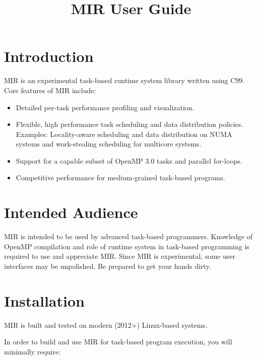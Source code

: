 \documentclass[11pt,a4paper]{article}
\title{MIR User Guide}
\begin{document}
\maketitle

\section{Introduction}\label{introduction}

MIR is an experimental task-based runtime system library written using C99.
Core features of MIR include:

\begin{itemize}
    \item Detailed per-task performance profiling and visualization.
    \item Flexible, high performance task scheduling and data distribution
        policies. Examples: Locality-aware scheduling and data distribution on
        NUMA systems and work-stealing scheduling for multicore systems.
    \item Support for a capable subset of OpenMP 3.0 tasks and parallel
        for-loops.
    \item Competitive performance for medium-grained task-based programs.
\end{itemize}

\section{Intended Audience}\label{intended-audience}

MIR is intended to be used by advanced task-based programmers. Knowledge of
OpenMP compilation and role of runtime system in task-based programming is
required to use and appreciate MIR. Since MIR is experimental, some user
interfaces may be unpolished. Be prepared to get your hands dirty.

\section{Installation}\label{installation}

MIR is built and tested on modern (2012+) Linux-based systems.

In order to build and use MIR for task-based program execution, you will minimally require:
\end{document}
